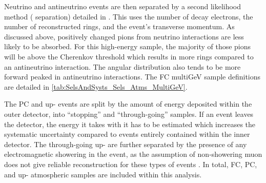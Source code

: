 Neutrino and antineutrino events are then separated by a second likelihood method (\quickmath{\nu/\bar{\nu}} separation) detailed in \cite{Kamiokande_Collaboration2017-nf}. This uses the number of decay electrons, the number of reconstructed rings, and the event's transverse momentum. As discussed above, positively changed pions from neutrino interactions are less likely to be absorbed. For this high-energy sample, the majority of those pions will be above the Cherenkov threshold which results in more rings compared to an antineutrino interaction. The angular distribution also tends to be more forward peaked in antineutrino interactions. The FC multiGeV sample definitions are detailed in \autoref{tab:SelsAndSysts_Sels_Atms_MultiGeV}.

The PC and up-\quickmath{\mu} events are split by the amount of energy deposited within the outer detector, into ``stopping'' and ``through-going'' samples. If an event leaves the detector, the energy it takes with it has to be estimated which increases the systematic uncertainty compared to events entirely contained within the inner detector. The through-going up-\quickmath{\mu} are further separated by the presence of any electromagnetic showering in the event, as the assumption of non-showering muon does not give reliable reconstruction for these types of events \cite{Ashie_2005}. In total,  FC,  PC, and  up-\quickmath{\mu} atmospheric samples are included within this analysis.

